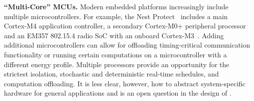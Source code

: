{\bf ``Multi-Core'' MCUs.}
Modern embedded platforms increasingly include multiple microcontrollers.
For example, the Nest
Protect~\cite{nestprotect} includes a main Cortex-M4 application controller, a secondary
Cortex-M0+ peripheral processor and an EM357 802.15.4 radio SoC with an
onboard Cortex-M3~\cite{nestprotect-teardown}.
Adding additional microcontrollers can allow for offloading timing-critical
communication functionality or running certain computations on a microcontroller
with a different energy profile.
Multiple
processors provide an opportunity for
the strictest isolation, stochastic and deterministic real-time schedules, and
computation offloading. It is less clear, however, how to abstract
system-specific hardware for general applications and is an open question in
the design of \name.







%
%




